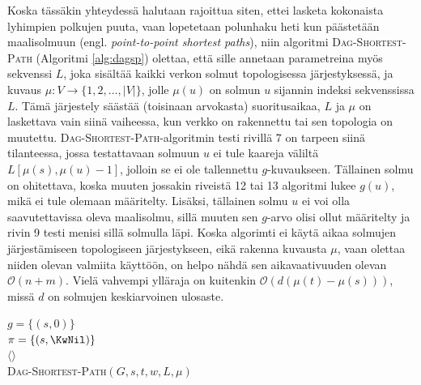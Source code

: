\documentclass[finnish]{tktltiki2}
\newenvironment{finalgo}[1][htb]{
  \renewcommand{\algorithmcfname}{Algoritmi}
  \begin{algorithm}[#1]
}{\end{algorithm}}
\theoremstyle{definition}
\theoremstyle{remark}
\begin{document}
Koska tässäkin yhteydessä halutaan rajoittua siten, ettei lasketa kokonaista lyhimpien polkujen puuta, vaan lopetetaan polunhaku heti kun päästetään maalisolmuun (engl. \textit{point-to-point shortest paths}), niin algoritmi \textsc{Dag-Shortest-Path} (Algoritmi \ref{alg:dagsp}) olettaa, että sille annetaan parametreina myös sekvenssi $L$, joka sisältää kaikki verkon solmut topologisessa järjestyksessä, ja kuvaus $\mu \colon V \to \{ 1, 2, \dots, |V| \}$, jolle $\mu(u)$ on solmun $u$ sijannin indeksi sekvenssissa $L$. Tämä järjestely säästää (toisinaan arvokasta) suoritusaikaa, $L$ ja $\mu$ on laskettava vain siinä vaiheessa, kun verkko on rakennettu tai sen topologia on muutettu. \textsc{Dag-Shortest-Path}-algoritmin testi rivillä 7 on tarpeen siinä tilanteessa, jossa testattavaan solmuun $u$ ei tule kaareja väliltä $L[\mu(s), \mu(u) - 1]$, jolloin se ei ole tallennettu $g$-kuvaukseen. Tällainen solmu on ohitettava, koska muuten jossakin riveistä 12 tai 13 algoritmi lukee $g(u)$, mikä ei tule olemaan määritelty. Lisäksi, tällainen solmu $u$ ei voi olla saavutettavissa oleva maalisolmu, sillä muuten sen $g$-arvo olisi ollut määritelty ja rivin 9 testi menisi sillä solmulla läpi. Koska algorimti ei käytä aikaa solmujen järjestämiseen topologiseen järjestykseen, eikä rakenna kuvausta $\mu$, vaan olettaa niiden olevan valmiita käyttöön, on helpo nähdä sen aikavaativuuden olevan $\mathcal{O}(n + m)$. Vielä vahvempi ylläraja on kuitenkin $\mathcal{O}(d(\mu(t) - \mu(s)))$, missä $d$ on solmujen keskiarvoinen ulosaste.
\begin{finalgo}[h]
$g = \{ (s, 0) \}$ \\
$\pi = \{ (s, \KwNil) \}$ \\
\KwRet $\langle \rangle$ \\
\caption{\textsc{Dag-Shortest-Path}$(G, s, t, w, L, \mu)$}
\label{alg:dagsp}
\end{finalgo}
\end{document}
